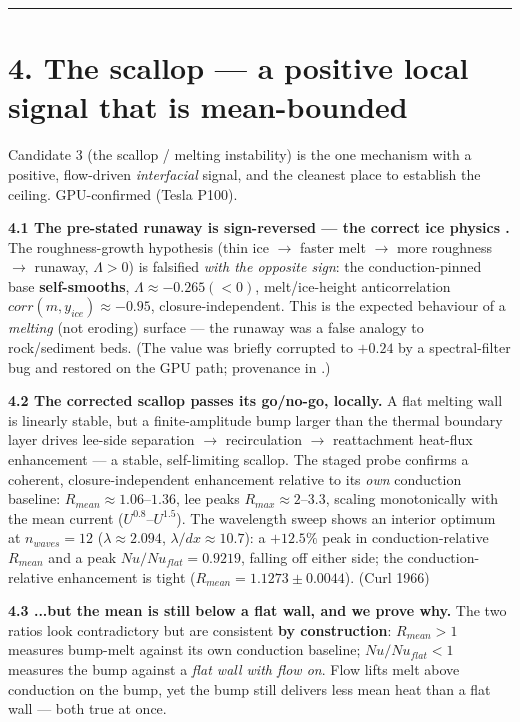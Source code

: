 \documentclass[11pt]{article}
\begin{document}
\medskip\hrule\medskip


\section*{4. The scallop — a positive local signal that is mean-bounded}


Candidate 3 (the scallop / melting instability) is the one mechanism with a positive, flow-driven \emph{interfacial} signal, and the cleanest place to establish the ceiling. GPU-confirmed (Tesla P100).


\textbf{4.1 The pre-stated runaway is sign-reversed — the correct ice physics .} The roughness-growth hypothesis (thin ice \ensuremath{\to} faster melt \ensuremath{\to} more roughness \ensuremath{\to} runaway, $\Lambda >0$) is falsified \emph{with the opposite sign}: the conduction-pinned base \textbf{self-smooths}, $\Lambda \approx -0.265 (<0)$, melt/ice-height anticorrelation $corr(m,y_{ice})\approx -0.95$, closure-independent. This is the expected behaviour of a \emph{melting} (not eroding) surface — the runaway was a false analogy to rock/sediment beds. (The value was briefly corrupted to $+0.24$ by a spectral-filter bug and restored on the GPU path; provenance in .)


\textbf{4.2 The corrected scallop passes its go/no-go, locally.} A flat melting wall is linearly stable, but a finite-amplitude bump larger than the thermal boundary layer drives lee-side separation \ensuremath{\to} recirculation \ensuremath{\to} reattachment heat-flux enhancement — a stable, self-limiting scallop. The staged probe confirms a coherent, closure-independent enhancement relative to its \emph{own} conduction baseline: $R_{mean}\approx 1.06–1.36$, lee peaks $R_{max}\approx 2–3.3$, scaling monotonically with the mean current ($U^{0.8}–U^{1.5}$). The wavelength sweep shows an interior optimum at $n_{waves}=12$ ($\lambda \approx 2.094$, $\lambda /dx\approx 10.7$): a $+12.5\%$ peak in conduction-relative $R_{mean}$ and a peak $Nu/Nu_{flat}=0.9219$, falling off either side; the conduction-relative enhancement is tight ($R_{mean}=1.1273\pm 0.0044$). (Curl 1966)


\textbf{4.3 ...but the mean is still below a flat wall, and we prove why.} The two ratios look contradictory but are consistent \textbf{by construction}: $R_{mean}>1$ measures bump-melt against its own conduction baseline; $Nu/Nu_{flat}<1$ measures the bump against a \emph{flat wall with flow on}. Flow lifts melt above conduction on the bump, yet the bump still delivers less mean heat than a flat wall — both true at once.
\end{document}
